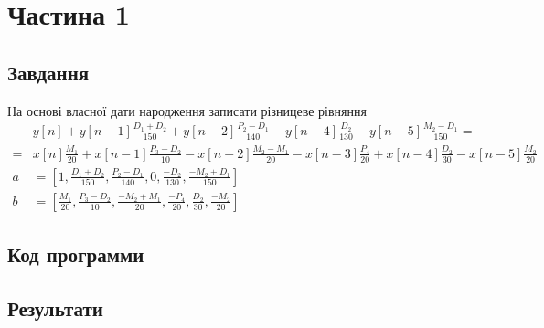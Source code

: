 \section{Частина 1}
\label{sec:task1}

\subsection{Завдання}
\label{subsec:task1_task}

На основі власної дати народження записати різницеве рівняння
\begin{align}
      & y[n]
    + y[n - 1] \frac{D_1 + D_2}{150}
    + y[n - 2] \frac{P_2 - D_1}{140}
    - y[n - 4] \frac{D_2}{130}
    - y[n - 5] \frac{M_2 - D_1}{150}
    =                         \\
    = & x[n] \frac{M_1}{20}
    + x[n - 1] \frac{P_3 - D_2}{10}
    - x[n - 2] \frac{M_2 - M_1}{20}
    - x[n - 3] \frac{P_4}{20}
    + x[n - 4] \frac{D_2}{30}
    - x[n - 5] \frac{M_2}{20} \\
    a & = [
    1,
    \frac{D_1 + D_2}{150},
    \frac{P_2 - D_1}{140},
    0,
    \frac{-D_2}{130},
    \frac{-M_2 + D_1}{150}
    ]                         \\
    b & = [
    \frac{M_1}{20},
    \frac{P_3 - D_2}{10},
    \frac{-M_2 + M_1}{20},
    \frac{-P_4}{20},
    \frac{D_2}{30},
    \frac{-M_2}{20}
    ]
\end{align}

\subsection{Код программи}
\label{subsec:task1_code}

\subsection{Результати}
\label{subsec:task1_results}
